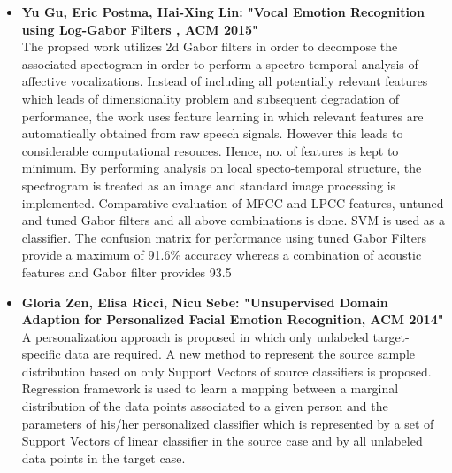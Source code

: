 \documentclass[oneside,a4paper,12pt]{report}
\begin{document}
\begin{normalsize}
\begin{itemize}
		\vspace{5mm}
	\item \textbf{ Yu Gu, Eric Postma, Hai-Xing Lin:  "Vocal Emotion Recognition using Log-Gabor Filters , ACM 2015"} \cite{gu15_vocal_emotion_recog_log_gabor_filter} \\
	The propsed work utilizes 2d Gabor filters in order to decompose the associated spectogram in order to perform a spectro-temporal analysis of affective vocalizations. Instead of including all potentially relevant features which leads of dimensionality problem and subsequent degradation of performance, the work uses feature learning in which relevant features are automatically obtained from raw speech signals. However this leads to considerable computational resouces. Hence, no. of features is kept to minimum. By performing analysis on local specto-temporal structure, the spectrogram is treated as an image and standard image processing is implemented. Comparative evaluation of MFCC and LPCC features, untuned and tuned Gabor filters and all above combinations is done. SVM is used as a classifier. The confusion matrix for performance using tuned Gabor Filters provide a maximum of 91.6\% accuracy whereas a combination of acoustic features and Gabor filter provides 93.5%
		\vspace{5mm}
	 \item \textbf{Gloria Zen, Elisa Ricci, Nicu Sebe:  "Unsupervised Domain Adaption for Personalized Facial Emotion Recognition, ACM 2014"} \cite{zen14_unsup_domain_adapt_person_facial_emotion_recog} \\
	A personalization approach is proposed in which only unlabeled target-specific data are required. A new method to represent the source sample distribution based on only Support Vectors of source classifiers is proposed. Regression framework is used to learn a mapping between a marginal distribution of the data points associated to a given person and the parameters of his/her personalized classifier which is represented by a set of Support Vectors of linear classifier in the source case and by all unlabeled data points in the target case.
	

\end{itemize}
\end{normalsize}
\end{document}
